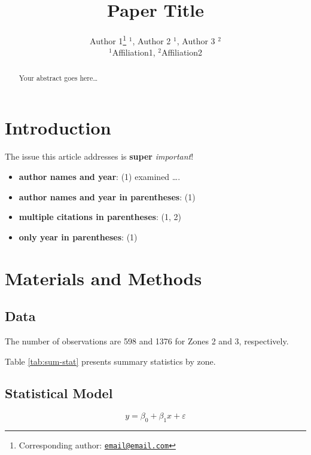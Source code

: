 \documentclass[
  12pt,
]{article}
\title{Paper Title}
\author{Author 1\footnote{Corresponding author: \href{mailto:email@email.com}{\nolinkurl{email@email.com}}} \(^1\), Author 2 \(^1\), Author 3 \(^2\)\\
\(^1\)Affiliation1, \(^2\)Affiliation2}
\date{}
\begin{document}
\maketitle
\begin{abstract}
Your abstract goes here\ldots{}
\end{abstract}

\hypertarget{introduction}{%
\section{Introduction}\label{introduction}}

The issue this article addresses is \textbf{super} \emph{important}!

\begin{itemize}
\item
  \textbf{author names and year}: (1) examined \ldots.
\item
  \textbf{author names and year in parentheses}: (1)
\item
  \textbf{multiple citations in parentheses}: (1, 2)
\item
  \textbf{only year in parentheses}: (1)
\end{itemize}

\newpage

\hypertarget{materials-and-methods}{%
\section{Materials and Methods}\label{materials-and-methods}}

\hypertarget{data}{%
\subsection{Data}\label{data}}

The number of observations are 598 and 1376 for Zones 2 and 3, respectively.

Table \ref{tab:sum-stat} presents summary statistics by zone.

\hypertarget{statistical-model}{%
\subsection{Statistical Model}\label{statistical-model}}

\begin{equation}
y = \beta_0 + \beta_1 x + \varepsilon \label{eq:eqn1}
\end{equation}
\end{document}
